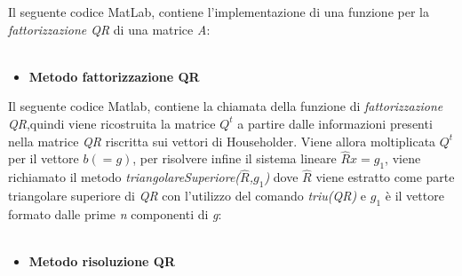 Il seguente codice MatLab, contiene l'implementazione di una funzione per la \textit{fattorizzazione QR} di una matrice \textit{A}:\\\
\begin{itemize}
\item \textbf{Metodo fattorizzazione QR}

\end{itemize}
Il seguente codice Matlab, contiene la chiamata della funzione di \textit{fattorizzazione QR},quindi viene ricostruita la matrice $Q^t$ a partire dalle informazioni presenti nella matrice \textit{QR} riscritta sui vettori di Householder. Viene allora moltiplicata $Q^t$ per il vettore $b(=g)$, per risolvere infine il sistema lineare $\hat{R}x=g_1$, viene richiamato il metodo \textit{triangolareSuperiore($\hat{R}$,$g_1$)} dove $\hat{R}$ viene estratto come parte triangolare superiore di \textit{QR} con l'utilizzo del comando \textit{triu(QR)} e $g_1$ è il vettore formato dalle prime \textit{n} componenti di \textit{g}: \\\
\begin{itemize}
\item \textbf{Metodo risoluzione QR}

\end{itemize}